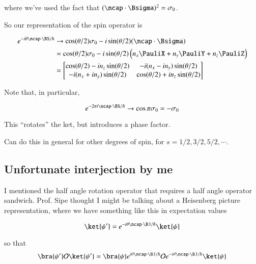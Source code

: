 where we've used the fact that $(\ncap \cdot \Bsigma)^2 = \sigma_0$.

So our representation of the spin operator is

\begin{equation}\label{eqn:qmTwoL15:30}
\begin{aligned}
e^{-i \theta \ncap \cdot \BS/\hbar} 
&\rightarrow
\cos(\theta/2) \sigma_0 -i \sin(\theta/2) (\ncap \cdot \Bsigma) \\
&=
\cos(\theta/2) \sigma_0 -i \sin(\theta/2) 
\left(n_x \PauliX + n_y \PauliY + n_z \PauliZ \right) \\
&=
\begin{bmatrix}
\cos(\theta/2) -i n_z \sin(\theta/2) & -i (n_x -i n_y) \sin(\theta/2) \\
-i (n_x + i n_y) \sin(\theta/2) & \cos(\theta/2) +i n_z \sin(\theta/2) 
\end{bmatrix}
\end{aligned}
\end{equation}

Note that, in particular, 

\begin{equation}\label{eqn:qmTwoL15:50}
e^{-2 \pi i \ncap \cdot \BS/\hbar} \rightarrow \cos\pi \sigma_0 = -\sigma_0
\end{equation}

This ``rotates'' the ket, but introduces a phase factor.

Can do this in general for other degrees of spin, for $s = 1/2, 3/2, 5/2, \cdots$.

\subsection{Unfortunate interjection by me}

I mentioned the half angle rotation operator that requires a half angle operator sandwich.  Prof. Sipe thought I might be talking about a Heisenberg picture representation, where we have something like this in expectation values

\begin{equation}\label{eqn:qmTwoL15:70}
\ket{\psi'} = e^{-i \theta \ncap \cdot \BJ/\hbar} \ket{\psi}
\end{equation}

so that 
\begin{equation}\label{eqn:qmTwoL15:90}
\bra{\psi'}
\mathcal{O}
\ket{\psi'} = \bra{\psi} 
e^{i \theta \ncap \cdot \BJ/\hbar} 
\mathcal{O}
e^{-i \theta \ncap \cdot \BJ/\hbar} 
\ket{\psi}
\end{equation}


